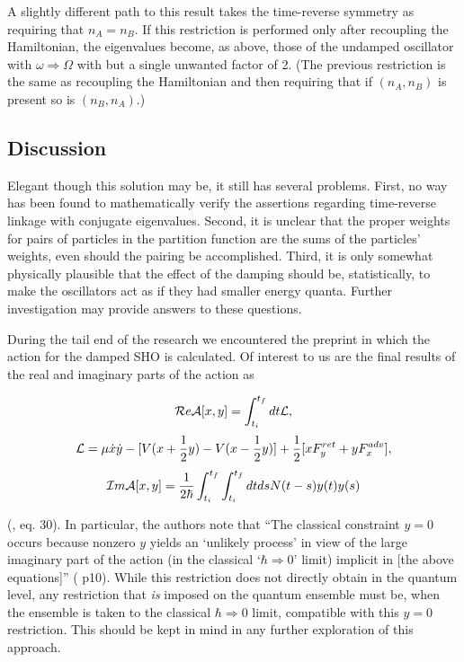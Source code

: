 A slightly different path to this result takes the time-reverse symmetry
as requiring that $n_{A} = n_{B}$.  If this restriction is performed only
after recoupling the Hamiltonian, the eigenvalues become, as above, those
of the undamped oscillator with $\omega \Rightarrow \Omega$ with but a
single unwanted factor of 2.  (The previous restriction is the same as
recoupling the Hamiltonian and then requiring that if $(n_{A}, n_{B})$ is
present so is $(n_{B}, n_{A})$.)

\subsection{Discussion}

Elegant though this solution may be, it still has several problems.
First, no way has been found to mathematically verify the
assertions regarding time-reverse linkage with conjugate eigenvalues.
Second, it is unclear that the proper weights for pairs of particles in the
partition function are the sums of the particles' weights, even should the
pairing be accomplished.  Third, it is only somewhat physically plausible
that the effect of the damping should be, statistically, to make the
oscillators act as if they had smaller energy quanta.  Further investigation
may provide answers to these questions.

During the tail end of the research we encountered the preprint \cite{action}
in which the action for the damped SHO is calculated.  Of interest to us are
the final results of the real and imaginary parts of the action as

\begin{equation}
{\cal R}e {\cal A}[x, y] = \int^{t_{f}}_{t_{i}} dt {\cal L},
\end{equation}
\begin{equation}
{\cal L} = \mu \dot{x} \dot{y} - [V(x + \frac{1}{2} y) - V(x - \frac{1}{2} y)]
	+ \frac{1}{2}[x F^{ret}_{y} + y F^{adv}_{x}],
\end{equation}
\begin{equation}
{\cal I}m {\cal A}[x, y] = \frac{1}{2 \hbar} \int^{t_{f}}_{t_{i}} 
	\int^{t_{f}}_{t_{i}} dt ds N(t - s) y(t) y(s)
\end{equation}

(\cite{action}, eq. 30).  In particular, the authors note that ``The classical
constraint $y = 0$ occurs because nonzero $y$ yields an `unlikely process' in
view of the large imaginary part of the action (in the classical `$\hbar 
\Rightarrow 0$' limit) implicit in [the above equations]'' (\cite{action} p10).
While this restriction does not directly obtain in the quantum level, any
restriction that {\em is} imposed on the quantum ensemble must be, when the 
ensemble is taken to the classical $\hbar \Rightarrow 0$ limit, compatible
with this $y = 0$ restriction.  This should be kept in mind in any further
exploration of this approach.


